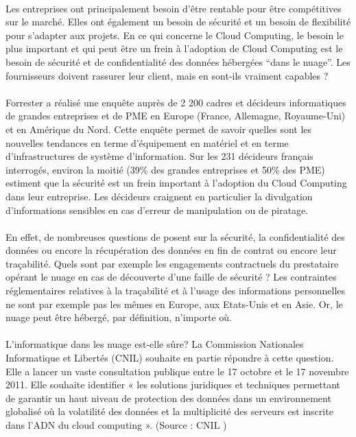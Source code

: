 \documentclass[a4paper,12pt]{report}
\begin{document}
\begin{onehalfspace}
	\paragraph*{}
	Les entreprises ont principalement besoin d’être rentable pour être compétitives sur le marché. Elles ont également un besoin de sécurité et un besoin de flexibilité pour s’adapter aux projets. En ce qui concerne le Cloud Computing, le besoin le plus important et qui peut être un frein à l’adoption de Cloud Computing est le besoin de sécurité et de confidentialité des données hébergées “dans le nuage”. Les fournisseurs doivent rassurer leur client, mais en sont-ils vraiment capables ?

	\paragraph*{}
	Forrester a réalisé une enquête \cite{source:forrester} auprès de 2 200 cadres et décideurs informatiques de grandes entreprises et de PME en Europe (France, Allemagne, Royaume-Uni) et en Amérique du Nord. Cette enquête permet de savoir quelles sont les nouvelles tendances en terme d’équipement en matériel et en terme d’infrastructures de système d’information. Sur les 231 décideurs français interrogés, environ la moitié (39\% des grandes entreprises et 50\% des PME) estiment que la sécurité est un frein important à l’adoption du Cloud Computing dans leur entreprise. Les décideurs craignent en particulier la divulgation d’informations sensibles en cas d’erreur de manipulation ou de piratage.

	\paragraph*{}
	En effet, de nombreuses questions de posent sur la sécurité, la confidentialité des données ou encore la récupération des données en fin de contrat ou encore leur traçabilité. Quels sont par exemple les engagements contractuels du prestataire opérant le nuage en cas de découverte d'une faille de sécurité ? Les contraintes réglementaires relatives à la traçabilité et à l'usage des informations personnelles ne sont par exemple pas les mêmes en Europe, aux Etats-Unis et en Asie. Or, le nuage peut être hébergé, par définition, n'importe où.

	\paragraph*{}
	L’informatique dans les nuage est-elle sûre? La Commission Nationales Informatique et Libertés (CNIL) souhaite en partie répondre à cette question. Elle a lancer un vaste consultation publique entre le 17 octobre et le 17 novembre 2011. Elle souhaite identifier « les solutions juridiques et techniques permettant de garantir un haut niveau de protection des données dans un environnement globalisé où la volatilité des données et la multiplicité des serveurs est inscrite dans l'ADN du cloud computing ». (Source : CNIL \cite{source:cnil})


\end{onehalfspace}
\end{document}
